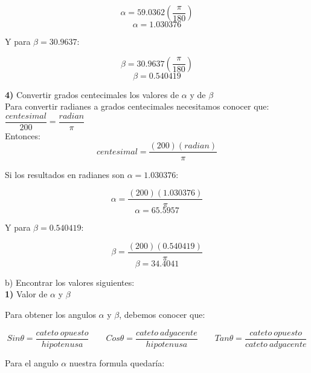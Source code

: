 \documentclass[11pt]{report}
\begin{document}
$$\alpha=59.0362\left(\frac{\pi}{180}\right)$$
$$\alpha=1.030376$$

Y para $\beta=30.9637$:

$$\beta=30.9637\left(\frac{\pi}{180}\right)$$
$$\beta=0.540419$$


\indent \textbf { 4)} Convertir grados centecimales los valores de $\alpha$ y de $\beta$ \\[2mm]
Para convertir radianes a grados centecimales necesitamos conocer que: $\dfrac{centesimal}{200}=\dfrac{radian}{\pi}$ \\[2mm]
Entonces: 
$$centesimal=\dfrac{(200)(radian)}{\pi}$$

Si los resultados en radianes son $\alpha=1.030376$:

$$\alpha=\dfrac{(200)(1.030376)}{\pi}$$
$$\alpha=65.5957$$

Y para $\beta=0.540419$:

$$\beta=\dfrac{(200)(0.540419)}{\pi}$$
$$\beta=34.4041$$

\pagebreak b) Encontrar los valores siguientes:\\[2mm]
\indent \textbf { 1)} Valor de $\alpha$ y $\beta$ \\[2mm]
\begin{center}
\end{center}
Para obtener los angulos $\alpha$ y $\beta$, debemos conocer que: 

$$Sin\theta=\frac{cateto\:opuesto}{hipotenusa} \qquad Cos\theta=\frac{cateto\:adyacente}{hipotenusa} \qquad Tan\theta=\frac{cateto\:opuesto}{cateto\:adyacente}$$

Para el angulo $\alpha$ nuestra formula quedaría:
\end{document}
